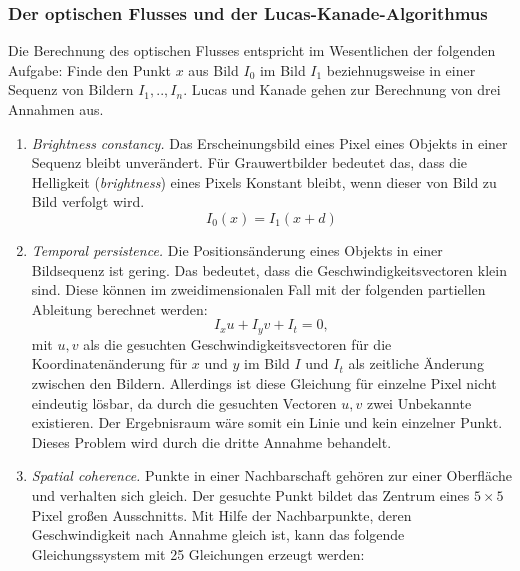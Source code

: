 \subsubsection{Der optischen Flusses und der Lucas-Kanade-Algorithmus}
Die Berechnung des optischen Flusses entspricht im Wesentlichen der folgenden Aufgabe: Finde den Punkt $x$ aus Bild $I_{0}$ im Bild $I_{1}$ beziehnugsweise in einer Sequenz von Bildern $I_{1},..,I_{n}$. Lucas und Kanade gehen zur Berechnung von drei Annahmen aus.

\begin{enumerate}
\item \textit{Brightness constancy.} Das Erscheinungsbild eines Pixel eines Objekts in einer Sequenz bleibt unverändert. Für Grauwertbilder bedeutet das, dass die Helligkeit (\textit{brightness}) eines Pixels Konstant bleibt, wenn dieser von Bild zu Bild verfolgt wird.
\[
I_{0}(x)=I_{1}(x+d)
\]

\item \textit{Temporal persistence. }Die Positionsänderung eines Objekts in einer Bildsequenz ist gering. Das bedeutet, dass die Geschwindigkeitsvectoren klein sind. Diese können im zweidimensionalen Fall mit der folgenden partiellen Ableitung berechnet werden:
\[
I_{x}u+I_{y}v+I_{t}=0,
\]
mit $u,v$ als die gesuchten Geschwindigkeitsvectoren für die Koordinatenänderung für $x$ und $y$ im Bild $I$ und $I_{t}$ als zeitliche Änderung zwischen den Bildern. Allerdings ist diese Gleichung für einzelne Pixel nicht eindeutig lösbar, da durch die gesuchten Vectoren $u,v$ zwei Unbekannte existieren. Der Ergebnisraum wäre somit ein Linie und kein einzelner Punkt. Dieses Problem wird durch die dritte Annahme behandelt.

\item \textit{Spatial coherence.} Punkte in einer Nachbarschaft gehören zur einer Oberfläche und verhalten sich gleich. Der gesuchte Punkt bildet das Zentrum eines $5\times5$ Pixel großen Ausschnitts.
Mit Hilfe der Nachbarpunkte, deren Geschwindigkeit nach Annahme gleich ist, kann das folgende Gleichungssystem mit 25 Gleichungen erzeugt werden:


\end{enumerate}

